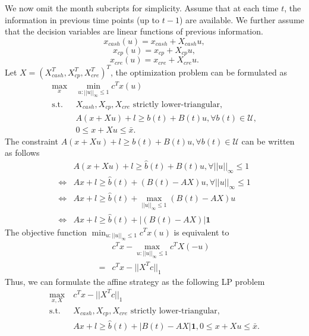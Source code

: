     We now omit the month subcripts for simplicity. Assume that at each time $t$, the information in previous time points (up to $t-1$) are available. We further assume that the decision variables are linear functions of previous information.
    \[
        x_{cash}(u) = x_{cash} + X_{cash}u,
    \]
    \[ 
        x_{cp}(u) = x_{cp} + X_{cp}u,
    \]
    \[ 
        x_{cre}(u) = x_{cre} + X_{cre}u.
    \]
    Let $X=(X_{cash}^T, X_{cp}^T, X_{cre}^T)^T$, the optimization problem can be formulated as 
    \[\begin{split}
       \max_x\ & \min_{u:||u||_\infty \leq 1} c^Tx(u) \\
        \text{s.t. } & X_{cash},  X_{cp}, X_{cre} \text{ strictly lower-triangular,}\\
        & A(x + Xu) + l\geq b(t) + B(t)u,\forall b(t) \in \mathcal{U},\\
        & 0\leq x+Xu \leq \bar{x}.
    \end{split}\]
    The constraint $A(x + Xu) + l\geq b(t) + B(t)u,\forall b(t) \in \mathcal{U}$ can be written as follows
    \[\begin{split}
        & A(x + Xu) + l\geq \hat{b}(t) + B(t)u,\forall ||u||_\infty\leq 1 \\
        \iff & Ax+l\geq \hat{b}(t) + (B(t)-AX)u, \forall ||u||_\infty \leq 1 \\
        \iff & Ax+l\geq \hat{b}(t) + \max_{||u||_\infty \leq 1}(B(t)-AX)u \\
        \iff & Ax+l\geq \hat{b}(t) + |(B(t)-AX)|\textbf{1}
    \end{split}\]
    The objective function $\min_{u:||u||_\infty \leq 1} c^Tx(u)$ is equivalent to
    \[\begin{split}
    & c^Tx - \max_{u:||u||_\infty \leq 1} c^TX(-u) \\
    = & c^Tx - ||X^Tc||_1
    \end{split}\]
    Thus, we can formulate the affine strategy as the following LP problem
    \[\begin{split}
       \max_{x, X}\ & c^Tx - ||X^Tc||_1  \\
        \text{s.t. } & X_{cash},  X_{cp}, X_{cre} \text{ strictly lower-triangular,}\\
        & Ax + l\geq  \hat{b}(t) + |B(t) - AX|\textbf{1}, 0\leq x+Xu \leq \bar{x}.
    \end{split}\]



